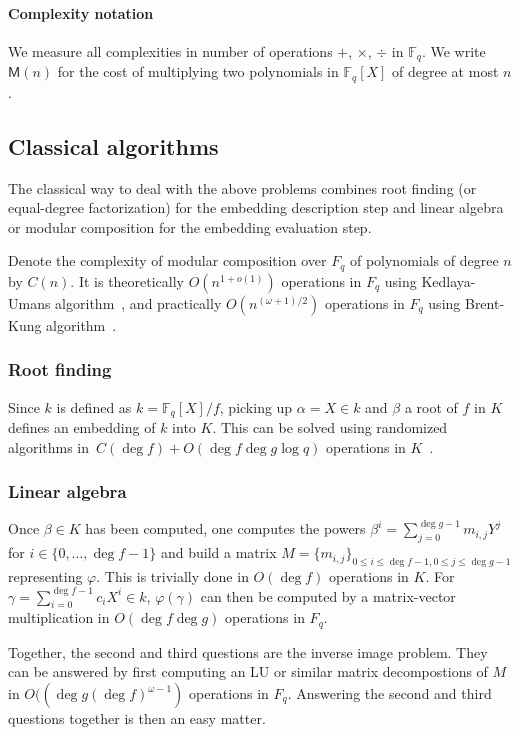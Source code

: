 \documentclass[12pt]{article}
\theoremstyle{plain}
\theoremstyle{definition}
\def\F{\ensuremath{\mathbb{F}}}
\def\MM{\ensuremath{\mathsf{M}}}
\newcounter{algorithm}
\begin{document}
\paragraph{Complexity notation} We measure all complexities in number
of operations $+$, $\times$, $\div$ in $\F_q$. We write $\MM(n)$ for
the cost of multiplying two polynomials in $\F_q[X]$ of degree at most
$n$.


\subsection{Classical algorithms}

The classical way to deal with the above problems combines
root finding (or equal-degree factorization)
for the embedding description step
and linear algebra or modular composition
for the embedding evaluation step.

Denote the complexity of modular composition over $F_q$
of polynomials of degree $n$ by $C(n)$.
It is theoretically $O(n^{1 + o(1)})$ operations in $F_q$
using Kedlaya-Umans algorithm~\cite{kedlaya+umans08},
and practically
$O(n^{(\omega + 1)/2})$ operations in $F_q$
using Brent-Kung algorithm~\cite{brent+kung}.

\subsubsection{Root finding}

Since $k$ is defined as $k=\F_q[X]/f$, picking up $\alpha = X\in k$
and $\beta$ a root of $f$ in $K$ defines an embedding of $k$ into $K$.
This can be solved using randomized algorithms
in~$C(\deg f) + O(\deg f \deg g \log q)$ operations
in $K$~\cite[Sec. 5]{von1992computing,KeUm11}.

\subsubsection{Linear algebra}

Once $\beta \in K$ has been computed, one computes the powers
$\beta^i = \sum_{j=0}^{\deg g-1} m_{i,j} Y^j$
for $i \in \{0, \ldots, \deg f-1\}$ and build a matrix
$M = \{m_{i, j}\}_{0\leq i \leq \deg f-1, 0 \leq j \leq \deg g -1}$
representing $\varphi$.
This is trivially done in $O(\deg f)$ operations in $K$.
For $\gamma = \sum_{i = 0}^{\deg f -1} c_i X^i \in k$,
$\varphi(\gamma)$ can then be computed by a
matrix-vector multiplication in $O(\deg f \deg g)$ operations in $F_q$.

Together, the second and third questions are the inverse image problem.
They can be answered by first computing 
an LU or similar matrix decompostions of $M$
in $O((\deg g (\deg f)^{\omega - 1})$ operations in $F_q$.
Answering the second and third questions together is then
an easy matter.
\end{document}
